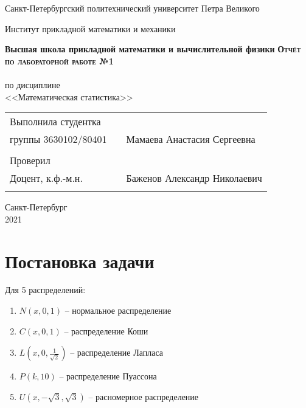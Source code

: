 \documentclass{article}
\begin{document}
\begin{titlepage}
  \begin{center}
    \large
    Санкт-Петербургский политехнический университет Петра Великого
    
    Институт прикладной математики и механики
    
    \textbf{Высшая школа прикладной математики и вычислительной физики}
    \vfill
    \textsc{\textbf{\Large{Отчёт по лабораторной работе №1}}}\\[5mm]
    \\ по дисциплине\\ <<Математическая статистика>>\\
\end{center}

\vfill

\begin{tabular}{l p{} l}
Выполнила студентка \\группы 3630102/80401 && Мамаева Анастасия Сергеевна \\
\\
Проверил\\Доцент, к.ф.-м.н.& \hspace{0pt} &   Баженов Александр Николаевич \\\\
\end{tabular}

\hfill \break
\hfill \break
\begin{center} Санкт-Петербург \\2021 \end{center}
\thispagestyle{empty}
\end{titlepage}
\newpage
\newpage
\begin{center}
    \setcounter{page}{2}
    \tableofcontents
\end{center}
\newpage
\begin{center}
    \setcounter{page}{3}
    \listoffigures
\end{center}

\newpage

\section {Постановка задачи}
\noindent Для 5 распределений:
\begin{enumerate}
	\item $N(x, 0, 1)$ -- нормальное распределение
	\item $C(x, 0, 1)$ -- распределение Коши
	\item $L(x, 0, \frac{1}{\sqrt{2}})$ -- распределение Лапласа 
	\item $P(k, 10)$ -- распределение Пуассона
	\item $U(x, -\sqrt{3}, \sqrt{3})$ -- расномерное распределение
\end{enumerate}
\end{document}
